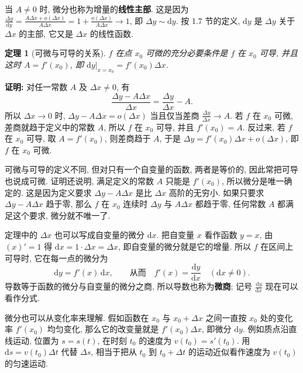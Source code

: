 \documentclass[UTF8,openany]{ctexbook}
\theoremstyle{chinesetextbook}
\newenvironment{cnproof}{\par\indent\textbf{证明:} \ignorespaces}{\par}
\newtheorem*{theoremsingle}{定理}
\newcommand{\dd}{\mathrm d}
\begin{document}
当 $A\ne0$ 时, 微分也称为增量的\textbf{线性主部}. 这是因为 $\displaystyle\frac{\Delta y}{\dd y}=\frac{A\Delta x+o(\Delta x)}{A\Delta x}=1+\frac{o(\Delta x)}{A\Delta x}\to1$, 即 $\Delta y\sim\dd y$. 按 1.7 节的定义, $\dd y$ 是 $\Delta y$ 关于 $\Delta x$ 的主部, 它又是 $\Delta x$ 的线性函数.
\begin{theoremsingle}[可微与可导的关系]
$f$ 在点 $x_0$ 可微的充分必要条件是 $f$ 在 $x_0$ 可导, 并且这时 $A=f'(x_0)$, 即 $\dd y\big|_{x=x_0}=f'(x_0)\Delta x$.
\end{theoremsingle}
\begin{cnproof}
对任一常数 $A$ 及 $\Delta x\ne0$, 有
\[
\frac{\Delta y-A\Delta x}{\Delta x}=\frac{\Delta y}{\Delta x}-A.
\]
所以 $\Delta x\to0$ 时, $\Delta y-A\Delta x=o(\Delta x)$ 当且仅当差商 $\displaystyle\frac{\Delta y}{\Delta x}\to A$. 若 $f$ 在 $x_0$ 可微, 差商就趋于定义中的常数 $A$, 所以 $f$ 在 $x_0$ 可导, 并且 $f'(x_0)=A$. 反过来, 若 $f$ 在 $x_0$ 可导, 取 $A=f'(x_0)$, 则差商趋于 $A$, 于是 $\Delta y=f'(x_0)\Delta x+o(\Delta x)$, 即 $f$ 在 $x_0$ 可微.
\end{cnproof}
可微与可导的定义不同, 但对只有一个自变量的函数, 两者是等价的, 因此常把可导也说成可微. 证明还说明, 满足定义的常数 $A$ 只能是 $f'(x_0)$, 所以微分是唯一确定的. 这是因为定义要求 $\Delta y-A\Delta x$ 是比 $\Delta x$ 高阶的无穷小. 如果只要求 $\Delta y-A\Delta x$ 趋于零, 那么 $f$ 在 $x_0$ 连续时 $\Delta y$ 与 $A\Delta x$ 都趋于零, 任何常数 $A$ 都满足这个要求, 微分就不唯一了.

定理中的 $\Delta x$ 也可以写成自变量的微分 $\dd x$. 把自变量 $x$ 看作函数 $y=x$, 由 $(x)'=1$ 得 $\dd x=1\cdot\Delta x=\Delta x$, 即自变量的微分就是它的增量. 所以 $f$ 在区间上可导时, 它在每一点的微分为
\[
\dd y=f'(x)\,\dd x,\qquad\text{从而}\quad f'(x)=\frac{\dd y}{\dd x}\quad(\dd x\ne0).
\]
导数等于函数的微分与自变量的微分之商, 所以导数也称为\textbf{微商}; 记号 $\displaystyle\frac{\dd y}{\dd x}$ 现在可以看作分式.

微分也可以从变化率来理解. 假如函数在 $x_0$ 与 $x_0+\Delta x$ 之间一直按 $x_0$ 处的变化率 $f'(x_0)$ 均匀变化, 那么它的改变量就是 $f'(x_0)\Delta x$, 即微分 $\dd y$. 例如质点沿直线运动, 位置为 $s=s(t)$, 在时刻 $t_0$ 的速度为 $v(t_0)=s'(t_0)$. 用 $\dd s=v(t_0)\Delta t$ 代替 $\Delta s$, 相当于把从 $t_0$ 到 $t_0+\Delta t$ 的运动近似看作速度为 $v(t_0)$ 的匀速运动.
\end{document}
